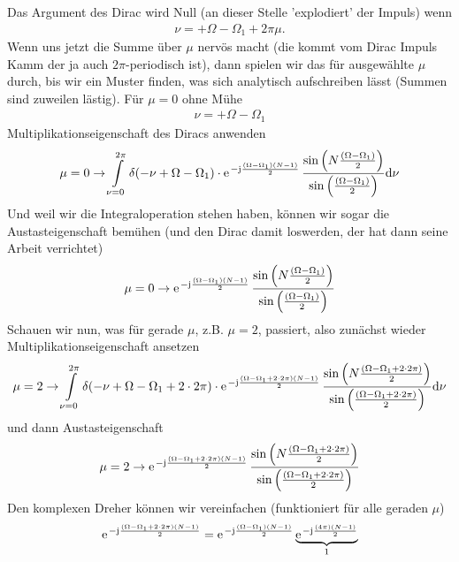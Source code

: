 \begin{ExCalc}
Das Argument des Dirac wird Null (an dieser Stelle 'explodiert' der Impuls) wenn
\begin{align}
\nu=+\Omega-\Omega_1 + 2\pi\mu.
\end{align}
Wenn uns jetzt die Summe über $\mu$ nervös macht (die kommt vom Dirac Impuls Kamm
der ja auch $2\pi$-periodisch ist), dann spielen wir das für ausgewählte
$\mu$ durch, bis wir ein Muster finden, was sich analytisch aufschreiben lässt
(Summen sind zuweilen lästig).
%
Für $\mu=0$ ohne Mühe
\begin{align}
\nu=+\Omega-\Omega_1
\end{align}
Multiplikationseigenschaft des Diracs anwenden
\begin{align}
\mu=0\rightarrow
\int\limits_{\nu=0}^{2\pi}
\delta(-\nu+\Omega-\Omega_1)
\cdot
\e^{-\im\frac{(\Omega-\Omega_1)(N-1)}{2}}\,
\frac{\sin\left(N\frac{(\Omega-\Omega_1)}{2}\right)}{\sin\left(\frac{(\Omega-\Omega_1)}{2}\right)}\fsd \nu
\end{align}
Und weil wir die Integraloperation stehen haben, können wir sogar die
Austasteigenschaft bemühen (und den Dirac damit loswerden, der hat dann seine Arbeit verrichtet)
\begin{align}
\mu=0\rightarrow
\e^{-\im\frac{(\Omega-\Omega_1)(N-1)}{2}}\,
\frac{\sin\left(N\frac{(\Omega-\Omega_1)}{2}\right)}{\sin\left(\frac{(\Omega-\Omega_1)}{2}\right)}
\end{align}
%
Schauen wir nun, was für gerade $\mu$, z.B. $\mu=2$, passiert, also zunächst wieder Multiplikationseigenschaft
ansetzen
\begin{align}
\mu=2\rightarrow
\int\limits_{\nu=0}^{2\pi}
\delta(-\nu+\Omega-\Omega_1+2 \cdot 2\pi)
\cdot
\e^{-\im\frac{(\Omega-\Omega_1 +2 \cdot  2\pi)(N-1)}{2}}\,
\frac{\sin\left(N\frac{(\Omega-\Omega_1 + 2 \cdot 2\pi)}{2}\right)}{\sin\left(\frac{(\Omega-\Omega_1 + 2 \cdot 2\pi)}{2}\right)}\fsd \nu
\end{align}
und dann Austasteigenschaft
\begin{align}
\mu=2\rightarrow
\e^{-\im\frac{(\Omega-\Omega_1 +2 \cdot  2\pi)(N-1)}{2}}\,
\frac{\sin\left(N\frac{(\Omega-\Omega_1 + 2 \cdot 2\pi)}{2}\right)}{\sin\left(\frac{(\Omega-\Omega_1 + 2 \cdot 2\pi)}{2}\right)}
\end{align}
%
Den komplexen Dreher können wir vereinfachen (funktioniert für alle geraden $\mu$)
\begin{align}
\e^{-\im\frac{(\Omega-\Omega_1 + 2 \cdot 2\pi)(N-1)}{2}} =
\e^{-\im\frac{(\Omega-\Omega_1)(N-1)}{2}}
\underbrace{\e^{-\im\frac{(4\pi)(N-1)}{2}}}_{1}
\end{align}

\end{ExCalc}
